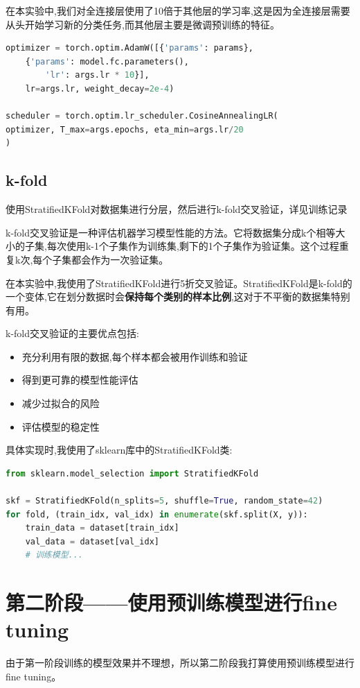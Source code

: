 \documentclass[12pt,a4paper,UTF8]{article}
\begin{document}
在本实验中,我们对全连接层使用了10倍于其他层的学习率,这是因为全连接层需要从头开始学习新的分类任务,而其他层主要是微调预训练的特征。

\begin{lstlisting}[language=Python, caption=不同层使用不同的学习率]
optimizer = torch.optim.AdamW([{'params': params},
    {'params': model.fc.parameters(),
        'lr': args.lr * 10}],
    lr=args.lr, weight_decay=2e-4)

scheduler = torch.optim.lr_scheduler.CosineAnnealingLR(
optimizer, T_max=args.epochs, eta_min=args.lr/20
)
\end{lstlisting}


\subsection{k-fold}

使用StratifiedKFold对数据集进行分层，然后进行k-fold交叉验证，详见训练记录


k-fold交叉验证是一种评估机器学习模型性能的方法。它将数据集分成k个相等大小的子集,每次使用k-1个子集作为训练集,剩下的1个子集作为验证集。这个过程重复k次,每个子集都会作为一次验证集。

在本实验中,我使用了StratifiedKFold进行5折交叉验证。StratifiedKFold是k-fold的一个变体,它在划分数据时会\textbf{保持每个类别的样本比例},这对于不平衡的数据集特别有用。

k-fold交叉验证的主要优点包括:

\begin{itemize}
    \item 充分利用有限的数据,每个样本都会被用作训练和验证
    \item 得到更可靠的模型性能评估
    \item 减少过拟合的风险
    \item 评估模型的稳定性
\end{itemize}

具体实现时,我使用了sklearn库中的StratifiedKFold类:

\begin{lstlisting}[language=Python]
from sklearn.model_selection import StratifiedKFold

skf = StratifiedKFold(n_splits=5, shuffle=True, random_state=42)
for fold, (train_idx, val_idx) in enumerate(skf.split(X, y)):
    train_data = dataset[train_idx]
    val_data = dataset[val_idx]
    # 训练模型...
\end{lstlisting}

\clearpage
\section{第二阶段——使用预训练模型进行fine tuning}
由于第一阶段训练的模型效果并不理想，所以第二阶段我打算使用预训练模型进行fine tuning。
\end{document}
